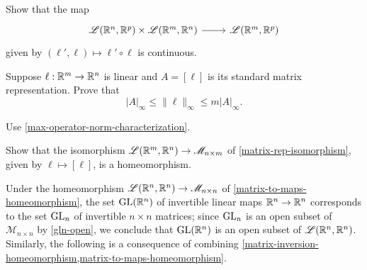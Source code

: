 \begin{exercise} \label{composition-continuous}
	Show that the map
	\[ \begin{tikzcd} \mathscr{L}(\R^n, \R^p) \times \mathscr{L}(\R^m, \R^n) \ar{r} & \mathscr{L}(\R^m, \R^p) \end{tikzcd} \]
	given by $(\ell', \ell) \mapsto \ell' \circ \ell$ is continuous. 
\end{exercise}

\begin{exercise} \label{max-matrix-norm-and-max-operator-norm}
	Suppose $\ell : \mathbb{R}^m \to \mathbb{R}^n$ is linear and $A = [\ell]$ is its standard matrix representation. Prove that 
	\[ |A|_\infty \leq \|\ell\|_\infty \leq m |A|_\infty. \]
	\begin{hint}
		Use \cref{max-operator-norm-characterization}.
	\end{hint}
\end{exercise}

\begin{comment} \label{operator-and-matrix-norms}
	Suppose $\ell : \R^m \to \R^n$ is linear and $A = [\ell]$ is its standard matrix representation.\index{representation!standard matrix representation} Prove the following. 
	\begin{enumerate}[(a)]
		\item $\|\ell\|_2 \leq |A|_2 \leq \sqrt{n} \|\ell\|_2$. 
		\item $|A|_\infty \leq \|\ell\|_2 \leq \sqrt{mn} |A|_\infty$. 
	\end{enumerate}
\end{comment}


\begin{exercise} \label{matrix-to-maps-homeomorphism} 
	Show that the isomorphism $\mathscr{L}(\mathbb{R}^m, \mathbb{R}^n) \to \mathscr{M}_{n \times m}$ of \cref{matrix-rep-isomorphism}, given by $\ell \mapsto [\ell]$, is a homeomorphism. 
\end{exercise}

Under the homeomorphism $\mathscr{L}(\mathbb{R}^n, \mathbb{R}^n) \to \mathscr{M}_{n \times n}$ of \cref{matrix-to-maps-homeomorphism}, the set $\operatorname{GL}(\mathbb{R}^n)$ of invertible linear maps $\mathbb{R}^n \to \mathbb{R}^n$ corresponds to the set $\operatorname{GL}_n$ of invertible $n \times n$ matrices; since $\operatorname{GL}_n$ is an open subset of $\mathscr{M}_{n \times n}$ by  \cref{gln-open}, we conclude that $\operatorname{GL}(\mathbb{R}^n)$ is an open subset of $\mathscr{L}(\mathbb{R}^n, \mathbb{R}^n)$. Similarly, the following is a consequence of combining \cref{matrix-inversion-homeomorphism,matrix-to-maps-homeomorphism}. 

